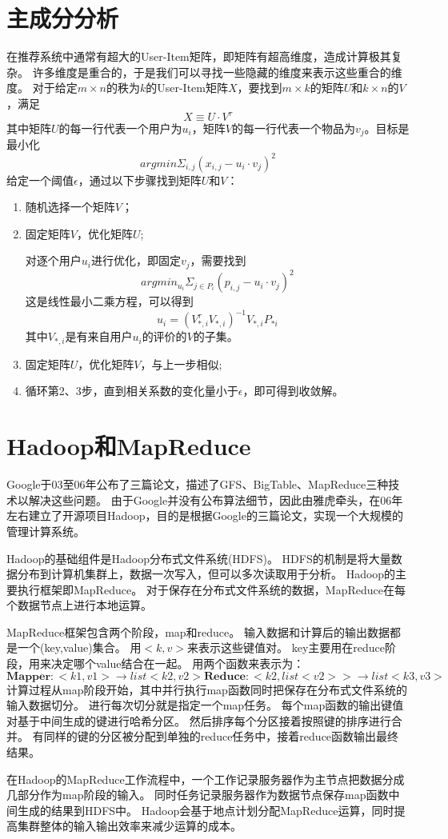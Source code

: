 \section{主成分分析}
在推荐系统中通常有超大的User-Item矩阵，即矩阵有超高维度，造成计算极其复杂。
许多维度是重合的，于是我们可以寻找一些隐藏的维度来表示这些重合的维度。
对于给定$m \times n$的秩为$k$的User-Item矩阵$X$，要找到$m \times k$的矩阵$U$和$k \times n$的$V$，满足
\[
X \equiv U \cdot V^\tau
\]
其中矩阵$U$的每一行代表一个用户为$u_i$，矩阵$V$的每一行代表一个物品为$v_j$。目标是最小化
\[
argmin \Sigma_{i,j}(x_{i,j}-u_i\cdot v_j)^2
\]
给定一个阈值$\epsilon$，通过以下步骤找到矩阵$U$和$V$：
\begin{enumerate}
	\item 随机选择一个矩阵$V$；
	\item 固定矩阵$V$，优化矩阵$U$;

	对逐个用户$u_i$进行优化，即固定$v_j$，需要找到
	\[
	argmin_{u_i} \Sigma_{j\in P_i}(p_{i,j}-u_i\cdot v_j)^2
	\]
	这是线性最小二乘方程，可以得到
	\[
	u_i=(V_{*,i}^{\tau}V_{*,i})^{-1}V_{*,i}P_{*i}
	\]
	其中$V_{*,i}$是有来自用户$u_i$的评价的$V$的子集。
	\item 固定矩阵$U$，优化矩阵$V$，与上一步相似;
	\item 循环第2、3步，直到相关系数的变化量小于$\epsilon$，即可得到收敛解。
\end{enumerate}
\section{Hadoop和MapReduce}
Google于03至06年公布了三篇论文，描述了GFS、BigTable、MapReduce三种技术以解决这些问题\parencite{Dean2004MapReduce,Ghemawat2003The,Chang2008Bigtable}。
由于Google并没有公布算法细节，因此由雅虎牵头，在06年左右建立了开源项目Hadoop，目的是根据Google的三篇论文，实现一个大规模的管理计算系统。

Hadoop的基础组件是Hadoop分布式文件系统(HDFS)。
HDFS的机制是将大量数据分布到计算机集群上，数据一次写入，但可以多次读取用于分析。
Hadoop的主要执行框架即MapReduce。
对于保存在分布式文件系统的数据，MapReduce在每个数据节点上进行本地运算。

MapReduce框架包含两个阶段，map和reduce。
输入数据和计算后的输出数据都是一个(key,value)集合。
用$<k,v>$来表示这些键值对。
key主要用在reduce阶段，用来决定哪个value结合在一起。
用两个函数来表示为：
\[
\mathbf{Mapper:} <k1,v1> \rightarrow list<k2,v2>
\mathbf{Reduce:} <k2,list<v2>> \rightarrow list<k3,v3>
\]
计算过程从map阶段开始，其中并行执行map函数同时把保存在分布式文件系统的输入数据切分。
进行每次切分就是指定一个map任务。
每个map函数的输出键值对基于中间生成的键进行哈希分区。
然后排序每个分区接着按照键的排序进行合并。
有同样的键的分区被分配到单独的reduce任务中，接着reduce函数输出最终结果。

在Hadoop的MapReduce工作流程中，一个工作记录服务器作为主节点把数据分成几部分作为map阶段的输入。
同时任务记录服务器作为数据节点保存map函数中间生成的结果到HDFS中。
Hadoop会基于地点计划分配MapReduce运算，同时提高集群整体的输入输出效率来减少运算的成本。